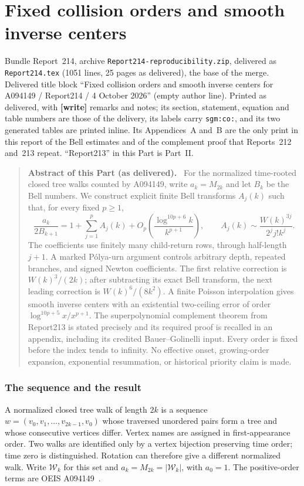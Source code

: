 \documentclass[11pt,letterpaper]{article}
\theoremstyle{remark}\newtheorem{remark}[theorem]{Remark}
\newcommand{\Wc}{\mathcal W}\newcommand{\Uc}{\mathcal U}\newcommand{\Part}{\operatorname{Part}}
\newcommand{\file}[1]{\nolinkurl{#1}}
\newenvironment{partabstract}{\begin{quote}\small\noindent\textbf{Abstract of this Part (as delivered).}\ }{\end{quote}}
\newcommand{\partsource}[1]{\par\noindent\begin{minipage}{\textwidth}\small #1\end{minipage}\par\medskip}
\theoremstyle{definition}\newtheorem{definition}[theorem]{Definition}
\begin{document}
\part{Fixed collision orders and smooth inverse centers}\label{sgm:co:part}
\partsource{Bundle Report~214, archive \file{Report214-reproducibility.zip}, delivered as \file{Report214.tex} (1051 lines, 25 pages as delivered), the base of the merge. Delivered title block ``Fixed collision orders and smooth inverse centers for A094149 / Report214 / 4 October 2026'' (empty author line). Printed as delivered, with \textbf{[write]} remarks and notes; its section, statement, equation and table numbers are those of the delivery, its labels carry \file{sgm:co:}, and its two generated tables are printed inline. Its Appendices~A and~B are the only print in this report of the Bell estimates and of the complement proof that Reports~212 and~213 repeat. ``Report213'' in this Part is Part~II.}
\begin{partabstract}
For the normalized time-rooted closed tree walks counted by A094149, write $a_k=M_{2k}$ and let $B_k$ be the Bell numbers. We construct explicit finite Bell transforms $A_j(k)$ such that, for every fixed $p\ge1$,
\[
 \frac{a_k}{2B_{k+1}}=1+\sum_{j=1}^{p}A_j(k)
       +O_p\!\left(\frac{\log^{10p+6}k}{k^{p+1}}\right),\qquad
 A_j(k)\sim\frac{W(k)^{3j}}{2^j j!k^j}.
\]
The coefficients use finitely many child-return rows, through half-length $j+1$. A marked P\'olya-urn argument controls arbitrary depth, repeated branches, and signed Newton coefficients. The first relative correction is $W(k)^3/(2k)$; after subtracting its exact Bell transform, the next leading correction is $W(k)^6/(8k^2)$. A finite Poisson interpolation gives smooth inverse centers with an existential two-ceiling error of order $\log^{10p+5}x/x^{p+1}$. The superpolynomial complement theorem from Report213 is stated precisely and its required proof is recalled in an appendix, including its credited Bauer--Golinelli input. Every order is fixed before the index tends to infinity. No effective onset, growing-order expansion, exponential resummation, or historical priority claim is made.
\end{partabstract}

\section{The sequence and the result}\label{sgm:co:sec:main}
A normalized closed tree walk of length $2k$ is a sequence
$w=(v_0,v_1,\ldots,v_{2k-1},v_0)$ whose traversed unordered pairs form a tree and whose consecutive vertices differ. Vertex names are assigned in first-appearance order. Two walks are identified only by a vertex bijection preserving time order; time zero is distinguished. Rotation can therefore give a different normalized walk. Write $\Wc_k$ for this set and $a_k=M_{2k}=|\Wc_k|$, with $a_0=1$. The positive-order terms are OEIS A094149~\cite{oeis}.
\end{document}
